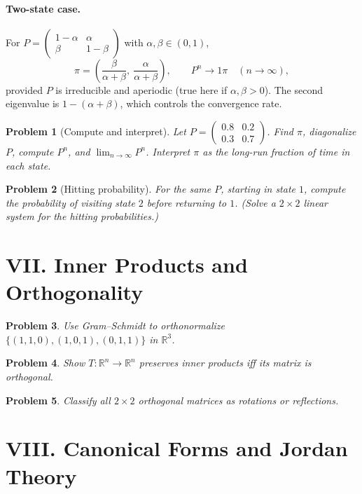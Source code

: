 \documentclass[11pt]{article}
\theoremstyle{upright}
\newtheorem{problem}{Problem}
\begin{document}
\paragraph{Two-state case.}
For $P=\begin{pmatrix}1-\alpha&\alpha\\ \beta&1-\beta\end{pmatrix}$ with $\alpha,\beta\in(0,1)$,
\[
\pi=\left(\frac{\beta}{\alpha+\beta},\ \frac{\alpha}{\alpha+\beta}\right),\qquad
P^n \to     1\pi \quad (n\to\infty),
\]
provided $P$ is irreducible and aperiodic (true here if $\alpha,\beta>0$). The second eigenvalue is $1-(\alpha+\beta)$, which controls the convergence rate.

\begin{problem}[Compute and interpret]
Let $P=\begin{pmatrix}0.8&0.2\\0.3&0.7\end{pmatrix}$. Find $\pi$, diagonalize $P$, compute $P^n$, and $\lim_{n\to\infty}P^n$. Interpret $\pi$ as the long-run fraction of time in each state.
\end{problem}

\begin{problem}[Hitting probability]
For the same $P$, starting in state $1$, compute the probability of visiting state $2$ before returning to $1$. (Solve a $2\times2$ linear system for the hitting probabilities.)
\end{problem}


\section*{VII. Inner Products and Orthogonality}

\begin{problem}
Use Gram--Schmidt to orthonormalize $\{(1,1,0),(1,0,1),(0,1,1)\}$ in $\mathbb{R}^3$.
\end{problem}

\begin{problem}
Show $T:\mathbb{R}^n\to\mathbb{R}^n$ preserves inner products iff its matrix is orthogonal.
\end{problem}

\begin{problem}
Classify all $2\times 2$ orthogonal matrices as rotations or reflections.
\end{problem}

\section*{VIII. Canonical Forms and Jordan Theory}
\end{document}
